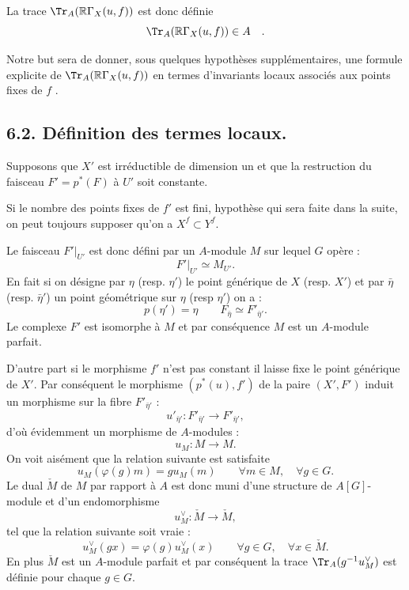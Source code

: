 La trace $\Tr_A(\mathbb{R}\Gamma_X(u, f))$ est donc définie
\[
\Tr_A(\mathbb{R}\Gamma_X(u, f)) \in A \quad .
\]

Notre but sera de donner, sous quelques hypothèses supplémentaires, une formule explicite de $\Tr_A(\mathbb{R}\Gamma_X(u, f))$ en termes d'invariants locaux associés aux points fixes de $f$ .

\bigskip

\subsection*{6.2. Définition des termes locaux.}
Supposons que $X'$ est irréductible de dimension un et que la restruction du faisceau $F'=p^*(F)$ à $U'$ soit constante.

Si le nombre des points fixes de $f'$ est fini, hypothèse qui sera faite dans la suite, on peut toujours supposer qu'on a $X^f \subset Y^f$.

Le faisceau $F'|_{U'}$ est donc défini par un $A$-module $M$ sur lequel $G$ opère :
\[
F'|_{U'} \simeq M_{U'} .
\]
En fait si on désigne par $\eta$ (resp. $\eta'$) le point générique de $X$ (resp. $X'$) et par $\bar\eta$ (resp. $\bar\eta'$) un point géométrique sur $\eta$ (resp $\eta'$) on a :
\[
p(\eta')=\eta\qquad F_{\bar\eta} \simeq F'_{\bar\eta'} .
\]
Le complexe $F'$ est isomorphe à $M$ et par conséquence $M$ est un $A$-module parfait.

D'autre part si le morphisme $f'$ n'est pas constant il laisse fixe le point générique de $X'$. Par conséquent le morphisme $(p^*(u),f')$ de la paire $(X',F')$ induit un morphisme sur la fibre $F'_{\bar\eta'}$ :
\[
u'_{\bar\eta'}:F'_{\bar\eta'}\longrightarrow F'_{\bar\eta'} ,
\]
d'où évidemment un morphisme de $A$-modules :
\[
u_M:M\longrightarrow M .
\]
On
voit aisément que la relation suivante est satisfaite
\begin{equation}\tag{6.2.1}
u_M(\varphi(g)m)=g u_M(m) \qquad \forall m\in M,\quad \forall g\in G .
\end{equation}
Le dual $\check{M}$ de $M$ par rapport à $A$ est donc muni d'une structure de $A[G]$-module et d'un endomorphisme
\[
u_M^\vee:\check{M}\longrightarrow \check{M} ,
\]
tel que la relation suivante soit vraie :
\[
u_M^\vee(gx)=\varphi(g)u_M^\vee(x) \qquad \forall g\in G,\quad \forall x\in \check{M} .
\]
En plus $\check{M}$ est un $A$-module parfait et par conséquent la trace $\Tr_A(g^{-1}u_M^\vee)$ est définie pour chaque $g\in G$.

